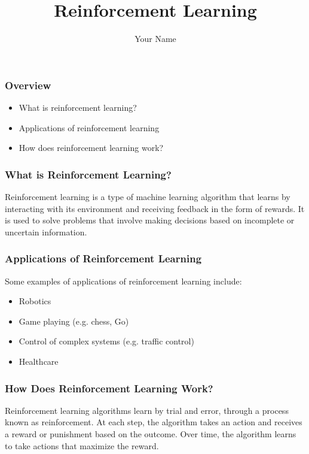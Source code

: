 \documentclass{beamer}
\title{Reinforcement Learning}
\author{Your Name}
\institute{Your Institution}
\begin{document}
\begin{frame}
\titlepage
\end{frame}

\begin{frame}
\frametitle{Overview}

\begin{itemize}
\item What is reinforcement learning?
\item Applications of reinforcement learning
\item How does reinforcement learning work?
\end{itemize}

\end{frame}

\begin{frame}
\frametitle{What is Reinforcement Learning?}

Reinforcement learning is a type of machine learning algorithm that learns by interacting with its environment and receiving feedback in the form of rewards. It is used to solve problems that involve making decisions based on incomplete or uncertain information.

\end{frame}

\begin{frame}
\frametitle{Applications of Reinforcement Learning}

Some examples of applications of reinforcement learning include:

\begin{itemize}
\item Robotics
\item Game playing (e.g. chess, Go)
\item Control of complex systems (e.g. traffic control)
\item Healthcare
\end{itemize}

\end{frame}

\begin{frame}
\frametitle{How Does Reinforcement Learning Work?}

Reinforcement learning algorithms learn by trial and error, through a process known as reinforcement. At each step, the algorithm takes an action and receives a reward or punishment based on the outcome. Over time, the algorithm learns to take actions that maximize the reward.

\end{frame}
\end{document}
